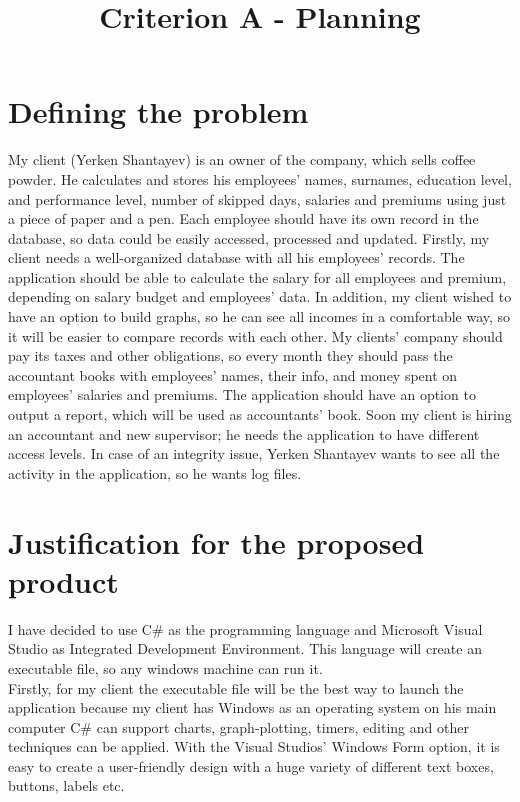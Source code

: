 \documentclass[a4paper]{article}
\author{}
\title{Criterion A - Planning}
\date{}
\begin{document}
\maketitle

\section*{Defining the problem}

My client (Yerken Shantayev) is an owner of the company, which sells coffee powder. He calculates and stores his employees’ names, surnames, education level, and performance level, number of skipped days, salaries and premiums using just a piece of paper and a pen. Each employee should have its own record in the database, so data could be easily accessed, processed and updated. Firstly, my client needs a well-organized database with all his employees’ records. The application should be able to calculate the salary for all employees and premium, depending on salary budget and employees’ data. In addition, my client wished to have an option to build graphs, so he can see all incomes in a comfortable way, so it will be easier to compare records with each other. My clients’ company should pay its taxes and other obligations, so every month they should pass the accountant books with employees’ names, their info, and money spent on employees’ salaries and premiums. The application should have an option to output a report, which will be used as accountants’ book. Soon my client is hiring an accountant and new supervisor; he needs the application to have different access levels. In case of an integrity issue, Yerken Shantayev wants to see all the activity in the application, so he wants log files.

\section*{Justification for the proposed product}

I have decided to use C\# as the programming language and Microsoft Visual Studio as Integrated Development Environment. This language will create an executable file, so any windows machine can run it.\\

Firstly, for my client the executable file will be the best way to launch the application because my client has Windows as an operating system on his main computer C\# can support charts, graph-plotting, timers, editing and other techniques can be applied. With the Visual Studios’ Windows Form option, it is easy to create a user-friendly design with a huge variety of different text boxes, buttons, labels etc.\\
\end{document}

